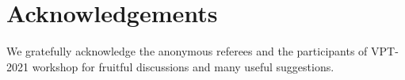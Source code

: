 \section*{Acknowledgements}
We gratefully acknowledge the anonymous referees and the participants of
VPT-2021 workshop for fruitful discussions and many useful suggestions.